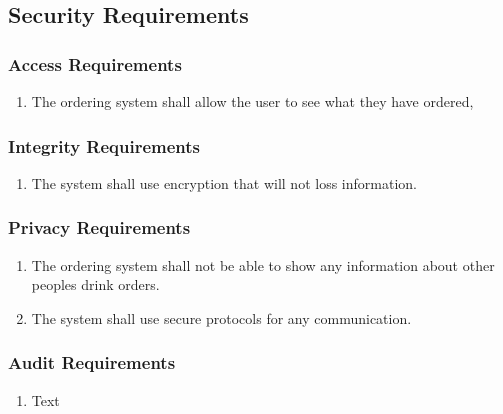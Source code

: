 \documentclass [11pt]{article}
\begin{document}
\subsection{Security Requirements }

\subsubsection{Access Requirements }
	\begin{enumerate}[label=\textbf{(\roman*)}]
		\item The ordering system shall allow the user to see what they have ordered,
		
	\end{enumerate}

\subsubsection{Integrity Requirements }
	\begin{enumerate}[label=\textbf{(\roman*)}]
		\item The system shall use encryption that will not loss information.
	\end{enumerate}

\subsubsection{Privacy Requirements }
	\begin{enumerate}[label=\textbf{(\roman*)}]
	\item The ordering system shall not be able to show any information about other peoples drink orders.
	\item The system shall use secure protocols for any communication.
	\end{enumerate}

\subsubsection{Audit  Requirements }
	\begin{enumerate}[label=\textbf{(\roman*)}]
		\item Text
	\end{enumerate} 
\end{document}

